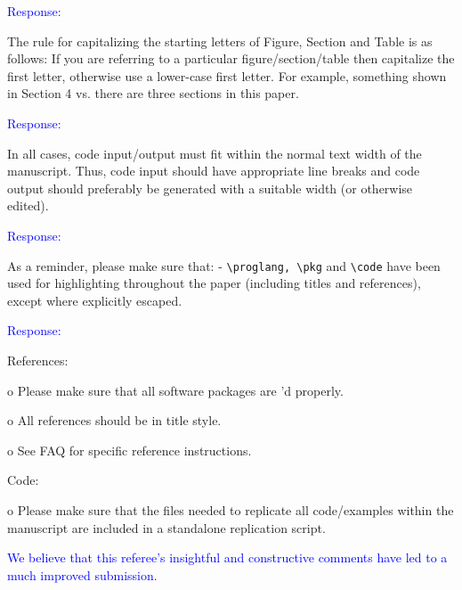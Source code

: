 \documentclass[12pt]{article}
\begin{document}
\textcolor{blue}{Response:}

The rule for capitalizing the starting letters of Figure, Section and
Table is as follows: If you are referring to a particular
figure/section/table then capitalize the first letter, otherwise use a
lower-case first letter. For example, something shown in Section 4
vs. there are three sections in this paper.

\textcolor{blue}{Response:}

In all cases, code input/output must fit within the normal text
width of the manuscript.  Thus, code input should have appropriate
line breaks and code output should preferably be generated with a
suitable width (or otherwise edited).

\textcolor{blue}{Response:}

As a reminder, please make sure that: - \verb+\proglang, \pkg+ and
\verb+\code+ have been used for highlighting throughout the paper
(including titles and references), except where explicitly escaped.

\textcolor{blue}{Response:}

References:



o Please make sure that all software packages are \cite{}'d properly.

o All references should be in title style.

o See FAQ for specific reference instructions.


Code:

o Please make sure that the files needed to replicate all
code/examples within the manuscript are included in a standalone
replication script.


\textcolor{blue}{We believe that this referee's insightful and
  constructive comments have led to a much improved submission.}
\end{document}
